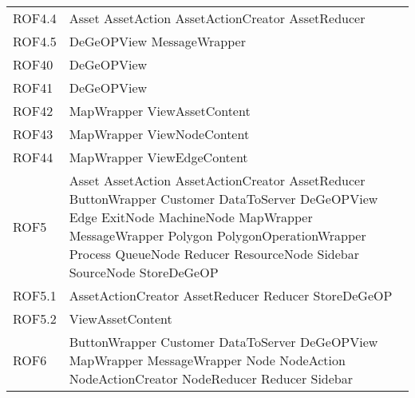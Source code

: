 \begin{longtable}{p{2.5cm}!{\VRule[1pt]}p{5cm}}
	ROF4.4 & Asset \newline AssetAction \newline AssetActionCreator \newline AssetReducer\\
	ROF4.5 & DeGeOPView \newline MessageWrapper\\
	ROF40 & DeGeOPView\\
	ROF41 & DeGeOPView\\
	ROF42 & MapWrapper \newline ViewAssetContent\\
	ROF43 & MapWrapper \newline ViewNodeContent\\
	ROF44 & MapWrapper \newline ViewEdgeContent\\
	ROF5 & Asset \newline AssetAction \newline AssetActionCreator \newline AssetReducer \newline ButtonWrapper \newline Customer \newline DataToServer \newline DeGeOPView \newline Edge \newline ExitNode \newline MachineNode \newline MapWrapper \newline MessageWrapper \newline Polygon \newline PolygonOperationWrapper \newline Process \newline QueueNode \newline Reducer \newline ResourceNode \newline Sidebar \newline SourceNode \newline StoreDeGeOP\\
	ROF5.1 & AssetActionCreator \newline AssetReducer \newline Reducer \newline StoreDeGeOP\\
	ROF5.2 & ViewAssetContent\\
	ROF6 & ButtonWrapper \newline Customer \newline DataToServer \newline DeGeOPView \newline MapWrapper \newline MessageWrapper \newline Node \newline NodeAction \newline NodeActionCreator \newline NodeReducer \newline Reducer \newline Sidebar\\

\end{longtable}
